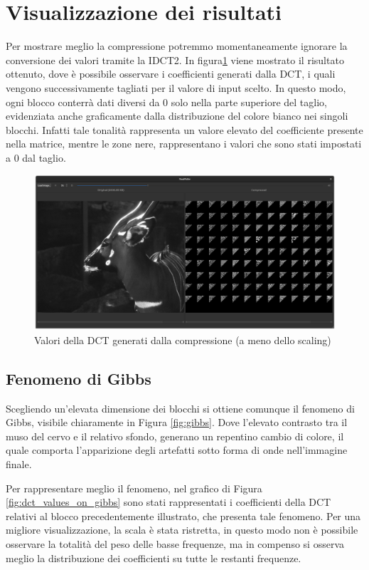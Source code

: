 \section{Visualizzazione dei risultati}

Per mostrare meglio la compressione potremmo momentaneamente ignorare la conversione dei valori tramite la IDCT2. In figura\ref{fig:compression_values} viene mostrato il risultato ottenuto, dove è possibile osservare i coefficienti generati dalla DCT, i quali vengono successivamente tagliati per il valore di input scelto. In questo modo, ogni blocco conterrà dati diversi da 0 solo nella parte superiore del taglio, evidenziata anche graficamente dalla distribuzione del colore bianco nei singoli blocchi. Infatti tale tonalità rappresenta un valore elevato del coefficiente presente nella matrice, mentre le zone nere, rappresentano i valori che sono stati impostati a 0 dal taglio.

\begin{figure}[h]
	\centering
	\includegraphics[width=1\linewidth]{figures/qt_dct_values}
	\caption{Valori della DCT generati dalla compressione (a meno dello scaling)}
	\label{fig:compression_values}
\end{figure}

\subsection{Fenomeno di Gibbs}

Scegliendo un'elevata dimensione dei blocchi si ottiene comunque il fenomeno di Gibbs, visibile chiaramente in Figura \ref{fig:gibbs}. Dove l'elevato contrasto tra il muso del cervo e il relativo sfondo, generano un repentino cambio di colore, il quale comporta l'apparizione degli artefatti sotto forma di onde nell'immagine finale.

Per rappresentare meglio il fenomeno, nel grafico di Figura \ref{fig:dct_values_on_gibbs} sono stati rappresentati i coefficienti della DCT relativi al blocco precedentemente illustrato, che presenta tale fenomeno. Per una migliore visualizzazione, la scala è stata ristretta, in questo modo non è possibile osservare la totalità del peso delle basse frequenze, ma in compenso si osserva meglio la distribuzione dei coefficienti su tutte le restanti frequenze.

